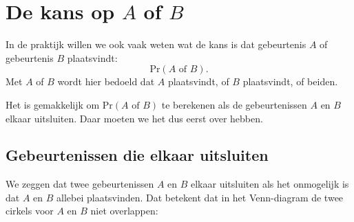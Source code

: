 \documentclass[
  a4paper,
]{scrbook}
\theoremstyle{definition}
\theoremstyle{definition}
\theoremstyle{remark}
\begin{document}
\section{\texorpdfstring{De kans op \(A\) of
\(B\)}{De kans op A of B}}\label{de-kans-op-a-of-b}

In de praktijk willen we ook vaak weten wat de kans is dat gebeurtenis
\(A\) of gebeurtenis \(B\) plaatsvindt:
\[ \textrm{Pr}\!\left(A \textrm{ of } B\right). \] Met \(A\) of \(B\)
wordt hier bedoeld dat \(A\) plaatsvindt, of \(B\) plaatsvindt, of
beiden.

Het is gemakkelijk om \(\textrm{Pr}\!\left(A \textrm{ of } B\right)\) te
berekenen als de gebeurtenissen \(A\) en \(B\) elkaar uitsluiten. Daar
moeten we het dus eerst over hebben.

\subsection{Gebeurtenissen die elkaar
uitsluiten}\label{gebeurtenissen-die-elkaar-uitsluiten}

We zeggen dat twee gebeurtenissen \(A\) en \(B\) elkaar uitsluiten als
het onmogelijk is dat \(A\) en \(B\) allebei plaatsvinden. Dat betekent
dat in het Venn-diagram de twee cirkels voor \(A\) en \(B\) niet
overlappen:
\end{document}
